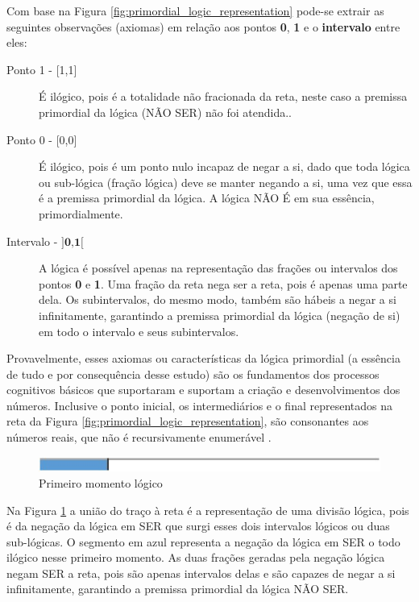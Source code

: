 Com base na Figura \ref{fig:primordial_logic_representation} pode-se extrair as seguintes observações (axiomas) em relação aos pontos \textbf{0}, \textbf{1} e o \textbf{intervalo} entre eles:
	\begin{description}
	   \item[Ponto 1 - {[1,1]}] É ilógico, pois é a totalidade não fracionada da reta, neste caso a premissa primordial da lógica (NÃO SER) não foi atendida..
	   \item[Ponto 0 - {[0,0]}] É ilógico, pois é um ponto nulo incapaz de negar a si, dado que toda lógica ou sub-lógica (fração lógica) deve se manter negando a si, uma vez que essa é a premissa primordial da lógica. A lógica NÃO É em sua essência, primordialmente.
	   \item[Intervalo - $\textbf{{]0,1[}}$] A lógica é possível apenas na representação das frações ou intervalos dos pontos \textbf{0} e \textbf{1}. Uma fração da reta nega ser a reta, pois é apenas uma parte dela. Os subintervalos, do mesmo modo, também são hábeis a negar a si infinitamente, garantindo a premissa primordial da lógica (negação de si) em todo o intervalo e seus subintervalos. 
	\end{description}

Provavelmente, esses axiomas ou características da lógica primordial (a essência de tudo e por consequência desse estudo) são os fundamentos dos processos cognitivos básicos que suportaram e suportam a criação e desenvolvimentos dos números. Inclusive o ponto inicial, os intermediários e o final representados na reta da Figura \ref{fig:primordial_logic_representation}, são consonantes aos números reais, que não é recursivamente enumerável \cite{smb_numeros_reais}. 
	\begin{figure}[H]
	\caption{Primeiro momento lógico}
	\label{fig:first_logical_moment}
	\centering
	\includegraphics[scale=1]{sections/images/first_logical_moment.jpg}
	\end{figure}

Na Figura \ref{fig:first_logical_moment} a união do traço à reta é a representação de uma divisão lógica, pois é da negação da lógica em SER que surgi esses dois intervalos lógicos ou duas sub-lógicas. O segmento em azul representa a negação da lógica em SER o todo ilógico nesse primeiro momento. As duas frações geradas pela negação lógica negam SER a reta, pois são apenas intervalos delas e são capazes de negar a si infinitamente, garantindo a premissa primordial da lógica NÃO SER. 








